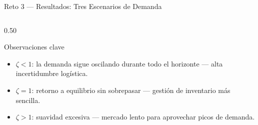 \documentclass[10pt,aspectratio=169]{beamer}
\begin{document}
\begin{frame}{Reto 3 — Resultados: Tres Escenarios de Demanda}
\begin{columns}[T]
\begin{column}{0.50\textwidth}
      \begin{block}{Observaciones clave}
        \begin{itemize}
          \item $\zeta < 1$: la demanda sigue oscilando durante
                todo el horizonte — alta incertidumbre logística.
          \item $\zeta = 1$: retorno a equilibrio sin sobrepasar
                — gestión de inventario más sencilla.
          \item $\zeta > 1$: suavidad excesiva — mercado lento
                para aprovechar picos de demanda.
        \end{itemize}
      \end{block}
    \end{column}
  \end{columns}
\end{frame}
\end{document}

